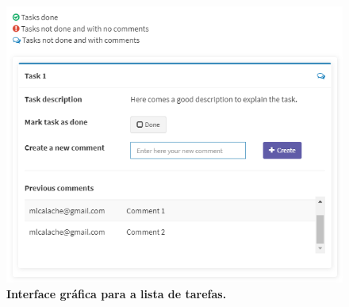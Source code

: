 \begin{figure}[h]
        \includegraphics[scale=0.6]{4-grasews/imagens/grasews-lista-tasks.png}
    \centering
    \caption[Interface gráfica para a lista de tarefas]{\textbf{Interface gráfica para a lista de tarefas.}}
    \label{fig:grasews-lista-tasks}
\end{figure}